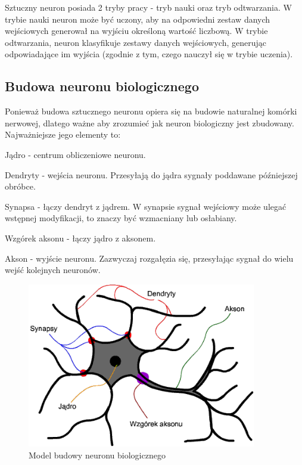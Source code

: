 Sztuczny neuron posiada 2 tryby pracy - tryb nauki oraz tryb odtwarzania. \newline
W trybie nauki neuron może być uczony, aby na odpowiedni zestaw danych
wejściowych generował na wyjściu określoną wartość liczbową. \newline
W trybie odtwarzania, neuron klasyfikuje zestawy danych wejściowych, generując
odpowiadające im wyjścia (zgodnie z tym, czego nauczył się w trybie uczenia).

\subsection{Budowa neuronu biologicznego}
Ponieważ budowa sztucznego neuronu opiera się na budowie naturalnej komórki nerwowej, dlatego ważne aby zrozumieć jak neuron biologiczny jest zbudowany. \\
Najważniejsze jego elementy to:
\begin{itemize*}
\item Jądro - centrum obliczeniowe neuronu.
\item Dendryty - wejścia neuronu. Przesyłają do jądra sygnały poddawane późniejszej obróbce.
\item Synapsa - łączy dendryt z jądrem. W synapsie sygnał wejściowy może ulegać wstępnej modyfikacji, to znaczy być wzmacniany lub osłabiany.
\item Wzgórek aksonu - łączy jądro z aksonem.
\item Akson - wyjście neuronu. Zazwyczaj rozgałęzia się, przesyłając sygnał do wielu wejść kolejnych neuronów.
\end{itemize*}

\begin{figure}[h]
\begin{center}
\includegraphics[width=10cm]{resources/figures/natural_neuron.png}
\caption{Model budowy neuronu biologicznego}
\end{center}
\end{figure}


